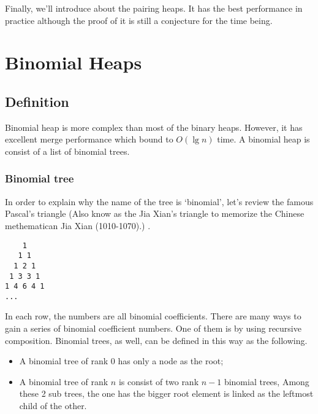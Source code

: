\documentclass{article}
\begin{document}
Finally, we'll introduce about the pairing heaps. It has the best performance in practice although the proof of it is still a conjecture for the time
being.


\section{Binomial Heaps}
\label{sec:binomial-heap} 


\subsection{Definition}

Binomial heap is more complex than most of the binary heaps. However,
it has excellent merge performance which bound to $O(\lg n)$ time. A
binomial heap is consist of a list of binomial trees.

\subsubsection{Binomial tree}
\label{Binomial tree} 

In order to explain why the name of the tree is `binomial', let's review
the famous Pascal's triangle (Also know as the Jia Xian's triangle to
memorize the Chinese methematican Jia Xian (1010-1070).)
\cite{wiki-pascal-triangle}.

\begin{verbatim}
    1
   1 1
  1 2 1
 1 3 3 1
1 4 6 4 1
...
\end{verbatim}

In each row, the numbers are all binomial coefficients. There are many
ways to gain a series of binomial coefficient numbers. One of them is
by using recursive composition. Binomial trees, as well, can be defined
in this way as the following.

\begin{itemize}
\item A binomial tree of rank 0 has only a node as the root;
\item A binomial tree of rank $n$ is consist of two rank $n-1$ binomial trees,
Among these 2 sub trees, the one has the bigger root element is linked as the
leftmost child of the other.
\end{itemize}
\end{document}
